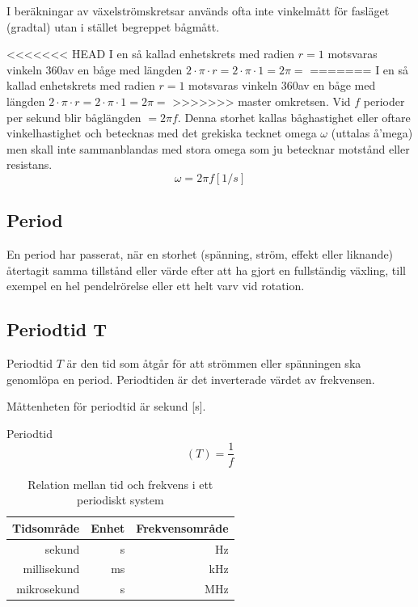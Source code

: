 I beräkningar av växelströmskretsar används ofta inte vinkelmått för fasläget
(gradtal) utan i stället begreppet bågmått.

<<<<<<< HEAD
I en så kallad enhetskrets med radien \(r = 1\) motsvaras vinkeln 360\degree av en
båge med längden \(2 \cdot \pi \cdot r= 2 \cdot \pi \cdot 1 = 2 \pi =\)
=======
I en så kallad enhetskrets med radien \(r = 1\) motsvaras vinkeln 360\degree av
en båge med längden \(2 \cdot \pi \cdot r= 2 \cdot \pi \cdot 1 = 2 \pi =\)
>>>>>>> master
omkretsen.
Vid \(f\) perioder per sekund blir båglängden \(= 2\pi f\).
Denna storhet kallas båghastighet eller oftare vinkelhastighet och betecknas
med det grekiska tecknet omega \(\omega\) (uttalas å'mega) men skall
inte sammanblandas med stora omega som ju betecknar motstånd eller resistans.
\[   \omega= 2\pi f \unit{[1/s]}   \]

\subsection{Period}

En period har passerat, när en storhet (spänning, ström, effekt eller
liknande) återtagit samma tillstånd eller värde efter att ha gjort en
fullständig växling, till exempel en hel pendelrörelse eller ett helt
varv vid rotation.

\subsection{Periodtid T}

Periodtid \(T\) är den tid som åtgår för att strömmen eller spänningen
ska genomlöpa en period. Periodtiden är det inverterade värdet av
frekvensen.

Måttenheten för periodtid är sekund [s].

Periodtid
\[   (T) = \dfrac{1}{f}   \]

\begin{table}[h]
  \centering
    \begin{tabular}{rrr}
	         Tidsområde & Enhet     & Frekvensområde \\ \hline
		     sekund & s         & Hz             \\
		millisekund & ms        & kHz            \\
		mikrosekund & \textmu s & MHz
	\end{tabular}
	\caption{Relation mellan tid och frekvens i ett periodiskt system}
\end{table}

